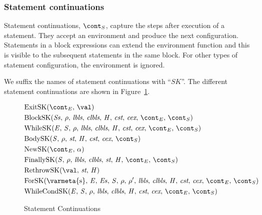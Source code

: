 \documentclass[a4paper,oneside]{article}
\begin{document}
\subsubsection{Statement continuations}
\label{subsubsec:statement-continuations}

Statement continuations, $\scont$, capture the steps after execution of a statement.
They accept an environment and produce the next configuration.
Statements in a block expressions can extend the environment function and this is visible to the subsequent statements in the same block.
For other types of statement configuration, the environment is ignored.

We suffix the names of statement continuations with ``$SK$''.
The different statement continuations are shown in Figure~\ref{figure:sconts}.

\newcommand{\ExitSK}[1]{\mathrm{ExitSK}(\econt,\,#1)}
\newcommand{\BlockSK}[2]{\mathrm{BlockSK}({#1},\,{#2},\,\lbls,\,\clbls,\,\handler,\,\cstrace,\,\cex,\,\econt,\,\scont)}
\newcommand{\WhileSK}{\mathrm{WhileSK}(\expr,\,\stmt,\,\env,\,\lbls,\,\clbls,\,\handler,\,\cstrace,\,\cex,\,\econt,\,\scont)}
\newcommand{\BodySK}[3]{\mathrm{BodySK}({#1},\,{#2},\,\strace,\,\handler,\,\cstrace,\,\cex,\,{#3})}
\newcommand{\NewSK}[2]{\mathrm{NewSK}({#1},\,{#2})}
\newcommand{\FinallySK}[1]{\mathrm{FinallySK}({#1},\,\env,\,\lbls,\,\clbls,\,\strace,\,\handler,\,\econt,\,\scont)}
\newcommand{\RethrowSK}[3]{\mathrm{RethrowSK}({#1},\,{#2},\,{#3})}
\newcommand{\ForSK}{\mathrm{ForSK}(\mathrm{\varmeta{s}},\, \expressionmeta,\, \exprs,\, \statementmeta,\, \env,\, \env',\, \lbls,\, \clbls,\, \handler,\, \cstrace,\, \cex,\, \econt,\, \scont)}
\newcommand{\WhileCondSK}{\mathrm{WhileCondSK}(\expr,\,\stmt,\,\env,\,\lbls,\,\clbls,\,\handler,\,\cstrace,\,\cex,\,\econt,\,\scont)}
\begin{figure}[Htp]
  \begin{eqfigure}
  \begin{align}
    &\ExitSK{\val} \label{scont:exit}\\
    &\BlockSK{\stmts}{\env} \label{scont:block}\\
    &\WhileSK \label{scont:while}\\
    &\BodySK{\stmt}{\env}{\scont} \label{scont:body}\\
    &\NewSK{\econt}{\loc} \label{scont:new}\\
    &\FinallySK{\stmt} \label{scont:finally}\\
    &\RethrowSK{\val}{\strace}{\handler} \label{scont:rethrow}\\
    &\ForSK \label{scont:for}\\
    &\WhileCondSK \label{scont:while}
  \end{align}
  \caption{Statement Continuations}
  \label{figure:sconts}
  \end{eqfigure}
\end{figure}
\end{document}

